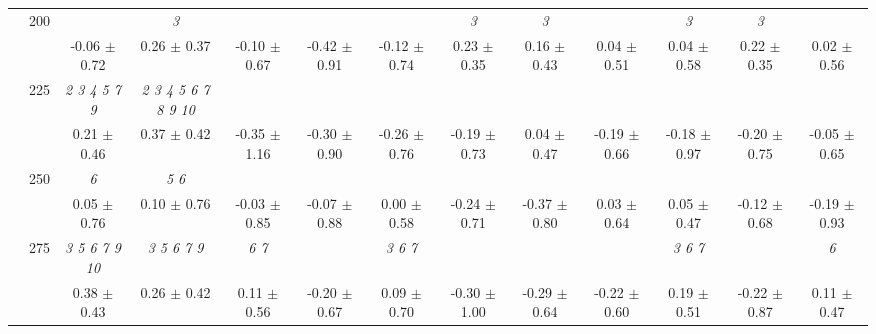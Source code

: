 \begin{table}[h]
{\begin{tabular}{
        ccccccccccccc}
 & \multirow{2}{*}{200}& & \textit{ 3 }& & & & \textit{ 3 }& \textit{ 3 }& & \textit{ 3 }& \textit{ 3 }&  \\ 
 & & -0.06 $\pm$ 0.72& 0.26 $\pm$ 0.37& -0.10 $\pm$ 0.67& -0.42 $\pm$ 0.91& -0.12 $\pm$ 0.74& 0.23 $\pm$ 0.35& 0.16 $\pm$ 0.43& 0.04 $\pm$ 0.51& 0.04 $\pm$ 0.58& 0.22 $\pm$ 0.35& 0.02 $\pm$ 0.56 \\ 
 & \multirow{2}{*}{225}& \cellcolor[HTML]{EFEFEF} \textit{ 2 3 4 5 7 9 }& \cellcolor[HTML]{EFEFEF} \textit{  2  3  4  5  6  7  8  9 10 }& \cellcolor[HTML]{EFEFEF} & \cellcolor[HTML]{EFEFEF} & \cellcolor[HTML]{EFEFEF} & \cellcolor[HTML]{EFEFEF} & \cellcolor[HTML]{EFEFEF} & \cellcolor[HTML]{EFEFEF} & \cellcolor[HTML]{EFEFEF} & \cellcolor[HTML]{EFEFEF} & \cellcolor[HTML]{EFEFEF}  \\ 
 & & \cellcolor[HTML]{EFEFEF} 0.21 $\pm$ 0.46& \cellcolor[HTML]{EFEFEF} 0.37 $\pm$ 0.42& \cellcolor[HTML]{EFEFEF} -0.35 $\pm$ 1.16& \cellcolor[HTML]{EFEFEF} -0.30 $\pm$ 0.90& \cellcolor[HTML]{EFEFEF} -0.26 $\pm$ 0.76& \cellcolor[HTML]{EFEFEF} -0.19 $\pm$ 0.73& \cellcolor[HTML]{EFEFEF} 0.04 $\pm$ 0.47& \cellcolor[HTML]{EFEFEF} -0.19 $\pm$ 0.66& \cellcolor[HTML]{EFEFEF} -0.18 $\pm$ 0.97& \cellcolor[HTML]{EFEFEF} -0.20 $\pm$ 0.75& \cellcolor[HTML]{EFEFEF} -0.05 $\pm$ 0.65 \\ 
 & \multirow{2}{*}{250}& \textit{ 6 }& \textit{ 5 6 }& & & & & & & & &  \\ 
 & & 0.05 $\pm$ 0.76& 0.10 $\pm$ 0.76& -0.03 $\pm$ 0.85& -0.07 $\pm$ 0.88& 0.00 $\pm$ 0.58& -0.24 $\pm$ 0.71& -0.37 $\pm$ 0.80& 0.03 $\pm$ 0.64& 0.05 $\pm$ 0.47& -0.12 $\pm$ 0.68& -0.19 $\pm$ 0.93 \\ 
 & \multirow{2}{*}{275}& \cellcolor[HTML]{EFEFEF} \textit{  3  5  6  7  9 10 }& \cellcolor[HTML]{EFEFEF} \textit{ 3 5 6 7 9 }& \cellcolor[HTML]{EFEFEF} \textit{ 6 7 }& \cellcolor[HTML]{EFEFEF} & \cellcolor[HTML]{EFEFEF} \textit{ 3 6 7 }& \cellcolor[HTML]{EFEFEF} & \cellcolor[HTML]{EFEFEF} & \cellcolor[HTML]{EFEFEF} & \cellcolor[HTML]{EFEFEF} \textit{ 3 6 7 }& \cellcolor[HTML]{EFEFEF} & \cellcolor[HTML]{EFEFEF} \textit{ 6 } \\ 
 & & \cellcolor[HTML]{EFEFEF} 0.38 $\pm$ 0.43& \cellcolor[HTML]{EFEFEF} 0.26 $\pm$ 0.42& \cellcolor[HTML]{EFEFEF} 0.11 $\pm$ 0.56& \cellcolor[HTML]{EFEFEF} -0.20 $\pm$ 0.67& \cellcolor[HTML]{EFEFEF} 0.09 $\pm$ 0.70& \cellcolor[HTML]{EFEFEF} -0.30 $\pm$ 1.00& \cellcolor[HTML]{EFEFEF} -0.29 $\pm$ 0.64& \cellcolor[HTML]{EFEFEF} -0.22 $\pm$ 0.60& \cellcolor[HTML]{EFEFEF} 0.19 $\pm$ 0.51& \cellcolor[HTML]{EFEFEF} -0.22 $\pm$ 0.87& \cellcolor[HTML]{EFEFEF} 0.11 $\pm$ 0.47 \\ 

\end{tabular}}
\end{table}
